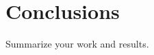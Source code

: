 
\chapter{Conclusions} %
Summarize your work and results.




\ifpdf
    \graphicspath{{X/figures/PNG/}{X/figures/PDF/}{X/figures/}}
\else
    \graphicspath{{X/figures/EPS/}{X/figures/}}
\fi










